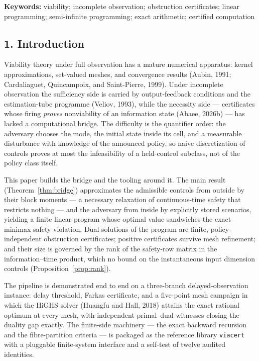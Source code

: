 \documentclass[10pt,twocolumn]{article}
\theoremstyle{plain}
\theoremstyle{definition}
\theoremstyle{remark}
\begin{document}
\textbf{Keywords:} viability; incomplete observation; obstruction
certificates; linear programming; semi-infinite programming; exact
arithmetic; certified computation

\subsection{1. Introduction}\label{introduction}

Viability theory under full observation has a mature numerical apparatus:
kernel approximations, set-valued meshes, and convergence results
(Aubin, 1991; Cardaliaguet, Quincampoix, and Saint-Pierre, 1999). Under
incomplete observation the sufficiency side is carried by output-feedback
conditions and the estimation-tube programme (Veliov, 1993), while the
necessity side --- certificates whose firing \emph{proves} nonviability of an
information state (Abaee, 2026b) --- has lacked a computational bridge. The
difficulty is the quantifier order: the adversary chooses the mode, the
initial state inside its cell, and a measurable disturbance with knowledge of
the announced policy, so naive discretization of controls proves at most the
infeasibility of a held-control subclass, not of the policy class itself.

This paper builds the bridge and the tooling around it. The main result
(Theorem~\ref{thm:bridge}) approximates the admissible controls from outside
by their block moments --- a necessary relaxation of continuous-time safety
that restricts nothing --- and the adversary from inside by explicitly stored
scenarios, yielding a finite linear program whose optimal value sandwiches
the exact minimax safety violation. Dual solutions of the program are finite,
policy-independent obstruction certificates; positive certificates survive
mesh refinement; and their size is governed by the rank of the
safety-row matrix in the information--time product, which no bound on the
instantaneous input dimension controls (Proposition~\ref{prop:rank}).

The pipeline is demonstrated end to end on a three-branch
delayed-observation instance: delay threshold, Farkas certificate, and a
five-point mesh campaign in which the HiGHS solver (Huangfu and Hall, 2018)
attains the exact rational optimum at every mesh, with independent
primal--dual witnesses closing the duality gap exactly. The finite-side
machinery --- the exact backward recursion and the fibre-partition criteria
--- is packaged as the reference library \texttt{viacert} with a pluggable
finite-system interface and a self-test of twelve audited identities.
\end{document}
